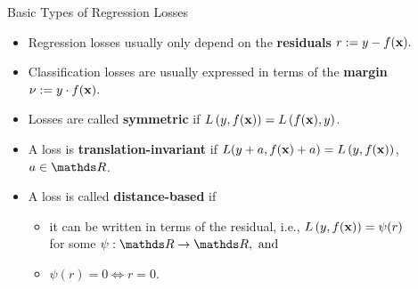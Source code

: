 \documentclass[11pt,compress,t,notes=noshow, xcolor=table]{beamer}
\begin{document}
\begin{vbframe}{Basic Types of Regression Losses}


\begin{itemize}
  \small
  \item Regression losses usually only depend on the \textbf{residuals}
  $r := y - f(\mathbf{x}).$
  \item Classification losses are usually expressed in terms of the 
  \textbf{margin} $\nu := y \cdot f(\mathbf{x}).$
  \item Losses are called \textbf{symmetric} if $L\left(y, f(\mathbf{x})\right) = L\left(f(\mathbf{x}), y\right)$. 
  \item A loss is \textbf{translation-invariant} if $L(y + a, f(\mathbf{x}) + a) = L\left(y, f(\mathbf{x})\right)$, 
  $a \in \R$.
  \item A loss is called \textbf{distance-based} if
  \begin{itemize}
    \small
    \item it can be written in terms of the residual, i.e., 
    $L\left(y, f(\mathbf{x})\right) = \psi (r)$ \\for some $\psi: \R \to \R, ~ \text{and}$
    \item $\psi(r) = 0 \Leftrightarrow r = 0$.
  \end{itemize}
\end{itemize}

\vfill


\end{vbframe}
\end{document}
